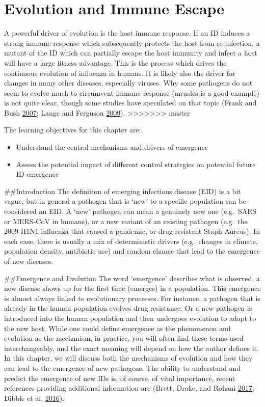 \documentclass[]{book}
\providecommand{\tightlist}{%
  \setlength{\itemsep}{0pt}\setlength{\parskip}{0pt}}
\theoremstyle{definition}
\theoremstyle{definition}
\theoremstyle{definition}
\theoremstyle{remark}
\begin{document}
\section{Evolution and Immune Escape}\label{evolution-and-immune-escape}

A powerful driver of evolution is the host immune response. If an ID
induces a strong immune response which subsequently protects the host
from re-infection, a mutant of the ID which can partially escape the
host immunity and infect a host will have a large fitness advantage.
This is the process which drives the continuous evolution of influenza
in humans. It is likely also the driver for changes in many other
diseases, especially viruses. Why some pathogens do not seem to evolve
much to circumvent immune response (measles is a good example) is not
quite clear, though some studies have speculated on that topic (Frank
and Bush \protect\hyperlink{ref-frank07}{2007}; Lange and Ferguson
\protect\hyperlink{ref-lange09}{2009}).
>>>>>>> master

The learning objectives for this chapter are:

\begin{itemize}
\tightlist
\item
  Understand the central mechanisms and drivers of emergence
\item
  Assess the potential impact of different control strategies on
  potential future ID emergence
\end{itemize}

\#\#Introduction The definition of emerging infectious disease (EID) is
a bit vague, but in general a pathogen that is `new' to a specific
population can be considered an EID. A `new' pathogen can mean a
genuinely new one (e.g.~SARS or MERS-CoV in humans), or a new variant of
an existing pathogen (e.g.~the 2009 H1N1 influenza that caused a
pandemic, or drug resistant Staph Aureus). In each case, there is
usually a mix of deterministic drivers (e.g.~changes in climate,
population density, antibiotic use) and random chance that lead to the
emergence of new diseases.

\#\#Emergence and Evolution The word `emergence' describes what is
observed, a new disease shows up for the first time (emerges) in a
population. This emergence is almost always linked to evolutionary
processes. For instance, a pathogen that is already in the human
population evolves drug resistance. Or a new pathogen is introduced into
the human population and then undergoes evolution to adapt to the new
host. While one could define emergence as the phenomenon and evolution
as the mechanism, in practice, you will often find these terms used
interchangeably, and the exact meaning will depend on how the author
defines it. In this chapter, we will discuss both the mechanisms of
evolution and how they can lead to the emergence of new pathogens. The
ability to understand and predict the emergence of new IDs is, of
course, of vital importance, recent references providing additional
information are (Brett, Drake, and Rohani
\protect\hyperlink{ref-brett17}{2017}; Dibble et al.
\protect\hyperlink{ref-dibble16}{2016}).
\end{document}
